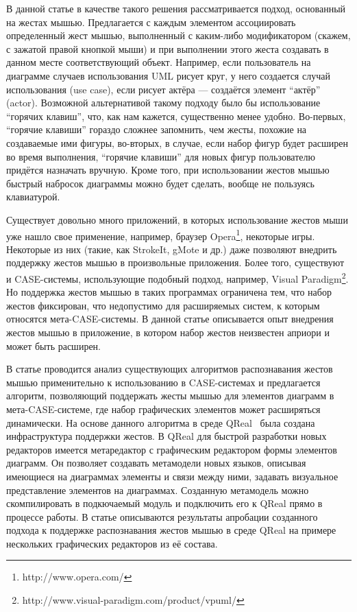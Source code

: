 \documentclass[a5paper]{article}
\begin{document}
В данной статье в качестве такого решения рассматривается подход, основанный на жестах мышью. Предлагается с каждым элементом ассоциировать определенный жест мышью, выполненный с каким-либо модификатором (скажем, с зажатой правой кнопкой мыши) и при выполнении этого жеста создавать в данном месте соответствующий объект. Например, если пользователь на диаграмме случаев использования UML рисует круг, у него создается случай использования (use case), если рисует актёра --- создаётся элемент ``актёр'' (actor). Возможной альтернативой такому подходу было бы использование ``горячих клавиш'', что, как нам кажется, существенно менее удобно. Во-первых, ``горячие клавиши'' гораздо сложнее запомнить, чем жесты, похожие на создаваемые ими фигуры, во-вторых, в случае, если набор фигур будет расширен во время выполнения, ``горячие клавиши'' для новых фигур пользователю придётся назначать вручную. Кроме того, при использовании жестов мышью быстрый набросок диаграммы можно будет сделать, вообще не пользуясь клавиатурой.

Существует довольно много приложений, в которых использование жестов мыши уже нашло свое применение, например, браузер Opera\footnote{http://www.opera.com/}, некоторые игры. Некоторые из них (такие, как StrokeIt, gMote и др.) даже позволяют внедрить поддержку  жестов мышью в произвольные приложения. Более того, существуют и CASE-системы, использующие подобный подход, например, Visual Paradigm\footnote{http://www.visual-paradigm.com/product/vpuml/}. Но поддержка жестов мышью в таких программах ограничена тем, что набор жестов фиксирован, что недопустимо для расширяемых систем, к которым относятся мета-CASE-системы. В данной статье описывается опыт внедрения жестов мышью в приложение, в котором набор жестов неизвестен априори и может быть расширен.

В статье проводится анализ существующих алгоритмов распознавания жестов мышью применительно к использованию в CASE-системах и предлагается алгоритм, позволяющий поддержать жесты мышью для элементов диаграмм в мета-CASE-системе, где набор графических элементов может расширяться динамически. На основе данного алгоритма в среде QReal~\cite{qreal} была создана инфраструктура поддержки жестов. В QReal для быстрой разработки новых редакторов имеется метаредактор с графическим редактором формы элементов диаграмм. Он позволяет создавать метамодели новых языков, описывая имеющиеся на диаграммах элементы и связи между ними, задавать визуальное представление элементов на диаграммах. Созданную метамодель можно скомпилировать в подкючаемый модуль и подключить его к QReal прямо в процессе работы. В статье описываются результаты апробации созданного подхода к поддержке распознавания жестов мышью в среде QReal на примере нескольких графических редакторов из её состава. 
\end{document}
